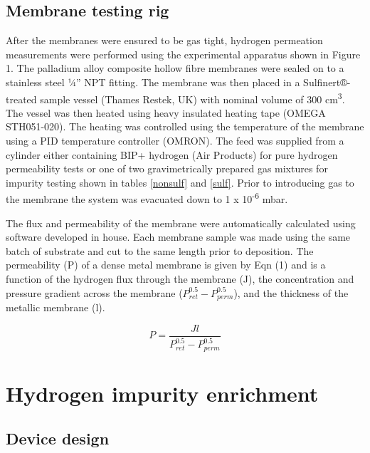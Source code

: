 \subsection{Membrane testing rig}
After the membranes were ensured to be gas tight, hydrogen permeation measurements were performed using the experimental apparatus shown in Figure 1. The palladium alloy composite hollow fibre membranes were sealed on to a stainless steel ¼” NPT fitting. The membrane was then placed in a Sulfinert®-treated sample vessel (Thames Restek, UK) with nominal volume of 300 cm\textsuperscript{3}. The vessel was then heated using heavy insulated heating tape (OMEGA STH051-020). The heating was controlled using the temperature of the membrane using a PID temperature controller (OMRON). The feed was supplied from a cylinder either containing BIP+ hydrogen (Air Products) for pure hydrogen permeability tests or one of two gravimetrically prepared gas mixtures for impurity testing shown in tables \ref{nonsulf} and \ref{sulf}. Prior to introducing gas to the membrane the system was evacuated down to 1 x 10\textsuperscript{-6} mbar.

The flux and permeability of the membrane were automatically calculated using software developed in house. Each membrane sample was made using the same batch of substrate and cut to the same length prior to deposition. The permeability (P)  of a dense metal membrane is given by Eqn (1) and is a function of the hydrogen flux through the membrane (J), the concentration and pressure gradient across the membrane ($P^{0.5}_{ret}-P^{0.5}_{perm}$), and the thickness of the metallic membrane (l). 

\begin{equation} \label{eq:1}
    P = \frac{J l}{P^{0.5}_{ret}-P^{0.5}_{perm}}
\end{equation}


\section{Hydrogen impurity enrichment}
\subsection{Device design}


\renewcommand{\bibname}{References}

